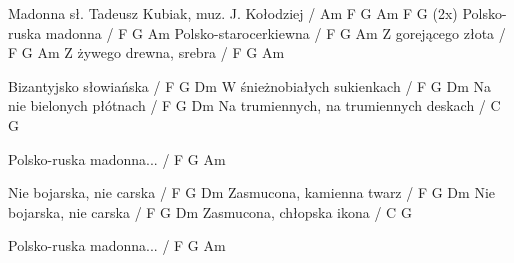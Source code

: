 Madonna
sł. Tadeusz Kubiak, muz. J. Kołodziej
/ Am F G Am F G (2x)
Polsko-ruska madonna / F G Am
Polsko-starocerkiewna / F G Am
Z gorejącego złota / F G Am
Z żywego drewna, srebra / F G Am

Bizantyjsko słowiańska / F G Dm
W śnieżnobiałych sukienkach / F G Dm
Na nie bielonych płótnach / F G Dm
Na trumiennych, na trumiennych deskach / C G

Polsko-ruska madonna... / F G Am

Nie bojarska, nie carska / F G Dm
Zasmucona, kamienna twarz / F G Dm
Nie bojarska, nie carska / F G Dm
Zasmucona, chłopska ikona / C G

Polsko-ruska madonna... / F G Am